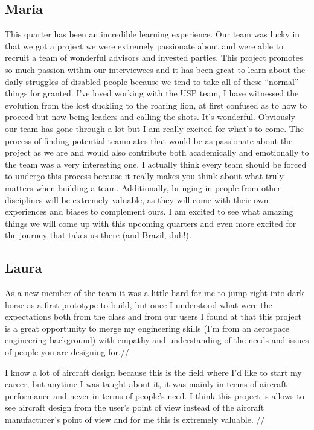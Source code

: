 \subsection{Maria}
This quarter has been an incredible learning experience. Our team was lucky in that we got a project we were extremely passionate about and were able to recruit a team of wonderful advisors and invested parties. This project promotes so much passion within our interviewees and it has been great to learn about the daily struggles of disabled people because we tend to take all of these “normal” things for granted. I’ve loved working with the USP team, I have witnessed the evolution from the lost duckling to the roaring lion, at first confused as to how to proceed but now being leaders and calling the shots. It’s wonderful. Obviously our team has gone through a lot but I am really excited for what’s to come. The process of finding potential teammates that would be as passionate about the project as we are and would also contribute both academically and emotionally to the team was a very interesting one. I actually think every team should be forced to undergo this process because it really makes you think about what truly matters when building a team. Additionally, bringing in people from other disciplines will be extremely valuable, as they will come with their own experiences and biases to complement ours. I am excited to see what amazing things we will come up with this upcoming quarters and even more excited for the journey that takes us there (and Brazil, duh!).

\subsection{Laura}
As a new member of the team it was a little hard for me to jump right into dark horse as a first prototype to build, but once I understood what were the expectations both from the class and from our users I found at that this project is a great opportunity to merge my engineering skills (I’m from an aerospace engineering background) with empathy and understanding of the needs and issues of people you are designing for.//

I know a lot of aircraft design because this is the field where I’d like to start my career, but anytime I was taught about it, it was mainly in terms of aircraft performance and never in terms of people’s need. I think this project is allows to see aircraft design from the user’s point of view instead of the aircraft manufacturer’s point of view and for me this is extremely valuable. //

